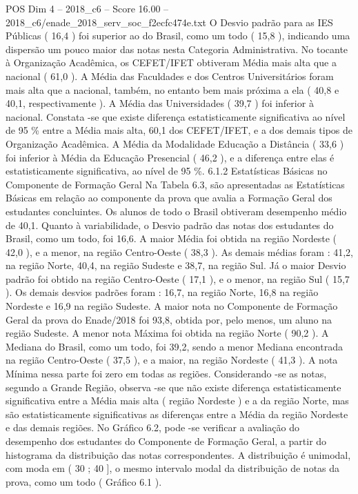 \begin{textsample}{POS Dim 4 – 2018\_c6 – Score 16.00 – 2018\_c6/enade\_2018\_serv\_soc\_f2ecfc474e.txt}
O Desvio padrão para as IES Públicas ( 16,4 ) foi superior ao do Brasil, como um todo ( 15,8 ), indicando uma dispersão um pouco maior das notas nesta Categoria Administrativa.
No tocante à Organização Acadêmica, os CEFET/IFET obtiveram Média mais alta que a nacional ( 61,0 ).
A Média das Faculdades e dos Centros Universitários foram mais alta que a nacional, também, no entanto bem mais próxima a ela ( 40,8 e 40,1, respectivamente ).
A Média das Universidades ( 39,7 ) foi inferior à nacional.
Constata -se que existe diferença estatisticamente significativa ao nível de 95 \% entre a Média mais alta, 60,1 dos CEFET/IFET, e a dos demais tipos de Organização Acadêmica.
A Média da Modalidade Educação a Distância ( 33,6 ) foi inferior à Média da Educação Presencial ( 46,2 ), e a diferença entre elas é estatisticamente significativa, ao nível de 95 \%. 6.1.2 Estatísticas Básicas no Componente de Formação Geral Na Tabela 6.3, são apresentadas as Estatísticas Básicas em relação ao componente da prova que avalia a Formação Geral dos estudantes concluintes.
Os alunos de todo o Brasil obtiveram desempenho médio de 40,1.
Quanto à variabilidade, o Desvio padrão das notas dos estudantes do Brasil, como um todo, foi 16,6.
A maior Média foi obtida na região Nordeste ( 42,0 ), e a menor, na região Centro-Oeste ( 38,3 ).
As demais médias foram : 41,2, na região Norte, 40,4, na região Sudeste e 38,7, na região Sul.
Já o maior Desvio padrão foi obtido na região Centro-Oeste ( 17,1 ), e o menor, na região Sul ( 15,7 ).
Os demais desvios padrões foram : 16,7, na região Norte, 16,8 na região Nordeste e 16,9 na região Sudeste.
A maior nota no Componente de Formação Geral da prova do Enade/2018 foi 93,8, obtida por, pelo menos, um aluno na região Sudeste.
A menor nota Máxima foi obtida na região Norte ( 90,2 ).
A Mediana do Brasil, como um todo, foi 39,2, sendo a menor Mediana encontrada na região Centro-Oeste ( 37,5 ), e a maior, na região Nordeste ( 41,3 ).
A nota Mínima nessa parte foi zero em todas as regiões.
Considerando -se as notas, segundo a Grande Região, observa -se que não existe diferença estatisticamente significativa entre a Média mais alta ( região Nordeste ) e a da região Norte, mas são estatisticamente significativas as diferenças entre a Média da região Nordeste e das demais regiões.
No Gráfico 6.2, pode -se verificar a avaliação do desempenho dos estudantes do Componente de Formação Geral, a partir do histograma da distribuição das notas correspondentes.
A distribuição é unimodal, com moda em ( 30 ; 40 ], o mesmo intervalo modal da distribuição de notas da prova, como um todo ( Gráfico 6.1 ).

\end{textsample}
